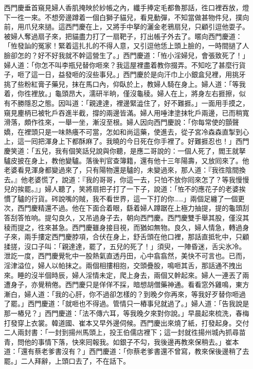 西門慶垂首窺見婦人香肌掩映於紗帳之內，纖手捧定毛都魯那話，徃口裡吞放，燈下一徃一來。不想旁邊蹲着一個白獅子貓兒，看見動彈，不知當做甚物件兒，撲向前，用爪兒來撾。{}這西門慶在上，又將手中拏的灑金老鴉扇兒，只顧引逗他耍子。被婦人奪過扇子來，把貓盡力打了一扇靶子，打出帳子外去了。暱向西門慶道：「恠發訕的冤家！緊着這扎扎的不得人意，又引逗他恁上頭上臉的，一時間撾了人臉卻怎的？好不好我就不幹這營生了。」西門慶道：「恠小淫婦兒，會張致死了！」婦人道：「你怎不叫李瓶兒替你咂來？我這屋裡盡着教你掇弄。不知吃了甚麼行貨子，咂了這一日，益發咂的沒些事兒。」西門慶於是向汗巾上小銀盒兒裡，用挑牙挑了些粉紅膏子藥兒，抹在馬口內，仰臥於上，教婦人騎在身上。婦人道：「等我𢵞着，你徃裡放。」龜頭昂大，濡研半晌，僅沒龜稜。婦人在上，將身左右捱擦，似有不勝隱忍之態。因叫道：「親達達，裡邊緊澁住了，好不難捱。」一面用手摸之，窺見麈柄已被牝戶吞進半截，撐的兩邊皆滿。婦人用唾津塗抹牝戶兩邊，已而稍寬滑落，頗作徃來，一舉一坐，漸沒至根。婦人因向西門慶說：「你每常使的顫聲嬌，在裡頭只是一味熱癢不可當，怎如和尚這藥，使進去，從子宮冷森森直掣到心上，這一囘把渾身上下都酥麻了。我曉的今日死在你手裡了。好難捱忍也！」{}西門慶笑道：「五兒，我有個笑話兒說與你聽，是應二哥說的：一個人死了，閻王就拏驢皮披在身上，教他變驢。落後判官查簿籍，還有他十三年陽壽，又放囘來了。他老婆看見渾身都變過來了，只有陽物還是驢的，未變過來，那人道：『我徃陰間換去。』他老婆慌了，說道：『我的哥哥，你這一去，只怕不放你囘來怎了？等我慢慢兒的挨罷。』」婦人聽了，笑將扇把子打了一下子，說道：「恠不的應花子的老婆挨慣了驢的行貨。硶說嘴的賊，我不看世界，這一下打的你……」兩個足纏了一個更次，西門慶精還不過。他在下面合着眼，繇着婦人蹲踞在上極力抽提，提的龜頭刮答刮答恠响。提勾良久，又吊過身子去，朝向西門慶。西門慶雙手舉其股，僅沒其稜而提之，徃來甚急。西門慶雖身接目視，而猶如無物。良久，婦人情急，轉過身子來，兩手摟定西門慶脖項，合伏在身上，舒舌頭在他口裡，那話直抵牝中，只顧揉搓，沒口子叫：「親達達，罷了，五兒的死了！」須臾，一陣昏迷，舌尖氷冷。泄訖一度，西門慶覺牝中一股熱氣直透丹田，心中翕翕然，美快不可言也。已而，淫津溢位，婦人以帕抹之。兩個相摟相抱，交頭疊股，鳴咂其舌，那話通不拽出來。睡的沒半個時辰，婦人淫情未定，爬上身去，兩個又幹起來。婦人一連丟了兩遭身子，亦覺稍倦。西門慶只是佯佯不採，暗想胡僧藥神通。看看窓外雞鳴，東方漸白，婦人道：「我的心肝，你不過卻怎樣的？到晚夕你再來，等我好歹替你咂過了罷。」西門慶道：「就咂也不得過。管情只一樁事兒就過了。」婦人道：「告我說是那一樁兒？」西門慶道：「法不傳六耳，等我晚夕來對你說。」早晨起來梳洗，春梅打發穿上衣裳。韓道國、崔本又早外邊伺候。西門慶出來燒了紙，打發起身。交付二人兩封書：「一封到揚州馬頭上，投王伯儒店裡下；這一封就徃揚州城內抓尋苗青，問他的事情下落，快來囘報我。如銀子不勾，我後邊再教來保稍去。」崔本道：「還有蔡老爹書沒有？」西門慶道：「你蔡老爹書還不曾寫，教來保後邊稍了去罷。」二人拜辭，上頭口去了，不在話下。

